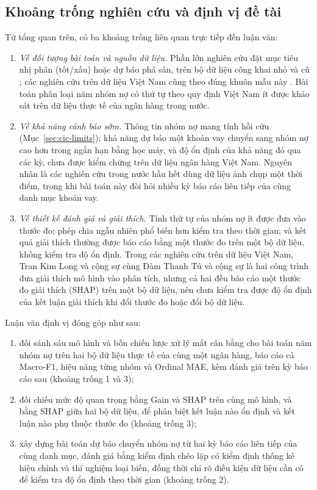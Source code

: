 \subsection{Khoảng trống nghiên cứu và định vị đề tài}
\label{sec:ch1-gaps}

Từ tổng quan trên, có ba khoảng trống liên quan trực tiếp đến luận văn:
\begin{enumerate}
    \item \textit{Về đối tượng bài toán và nguồn dữ liệu.} Phần lớn nghiên cứu đặt mục tiêu nhị phân (tốt/xấu) hoặc dự báo phá sản, trên bộ dữ liệu công khai nhỏ và cũ \cite{dastile2020statistical}; các nghiên cứu trên dữ liệu Việt Nam cũng theo đúng khuôn mẫu này \cite{dinh2007credit,tran2021mlcredit,trung2024credit,nguyen2025boosting}. Bài toán phân loại năm nhóm nợ có thứ tự theo quy định Việt Nam ít được khảo sát trên dữ liệu thực tế của ngân hàng trong nước.
    \item \textit{Về khả năng cảnh báo sớm.} Thông tin nhóm nợ mang tính hồi cứu (Mục~\ref{sec:cic-limits}); khả năng dự báo một khoản vay chuyển sang nhóm nợ cao hơn trong ngắn hạn bằng học máy, và độ ổn định của khả năng đó qua các kỳ, chưa được kiểm chứng trên dữ liệu ngân hàng Việt Nam. Nguyên nhân là các nghiên cứu trong nước hầu hết dùng dữ liệu ảnh chụp một thời điểm, trong khi bài toán này đòi hỏi nhiều kỳ báo cáo liên tiếp của cùng danh mục khoản vay.
    \item \textit{Về thiết kế đánh giá và giải thích.} Tính thứ tự của nhóm nợ ít được đưa vào thước đo; phép chia ngẫu nhiên phổ biến hơn kiểm tra theo thời gian; và kết quả giải thích thường được báo cáo bằng một thước đo trên một bộ dữ liệu, không kiểm tra độ ổn định. Trong các nghiên cứu trên dữ liệu Việt Nam, Tran Kim Long và cộng sự \cite{tran2022explainable} cùng Đàm Thanh Tú và cộng sự \cite{dam2025xai} là hai công trình đưa giải thích mô hình vào phân tích, nhưng cả hai đều báo cáo một thước đo giải thích (SHAP) trên một bộ dữ liệu, nên chưa kiểm tra được độ ổn định của kết luận giải thích khi đổi thước đo hoặc đổi bộ dữ liệu.
\end{enumerate}

Luận văn định vị đóng góp như sau:
\begin{enumerate}
    \item đối sánh sáu mô hình và bốn chiến lược xử lý mất cân bằng cho bài toán năm nhóm nợ trên hai bộ dữ liệu thực tế của cùng một ngân hàng, báo cáo cả Macro-F1, hiệu năng từng nhóm và Ordinal MAE, kèm đánh giá trên kỳ báo cáo sau (khoảng trống 1 và 3);
    \item đối chiếu mức độ quan trọng bằng Gain và SHAP trên cùng mô hình, và bằng SHAP giữa hai bộ dữ liệu, để phân biệt kết luận nào ổn định và kết luận nào phụ thuộc thước đo (khoảng trống 3);
    \item xây dựng bài toán dự báo chuyển nhóm nợ từ hai kỳ báo cáo liên tiếp của cùng danh mục, đánh giá bằng kiểm định chéo lặp có kiểm định thống kê hiệu chỉnh và thí nghiệm loại biến, đồng thời chỉ rõ điều kiện dữ liệu cần có để kiểm tra độ ổn định theo thời gian (khoảng trống 2).
\end{enumerate}

